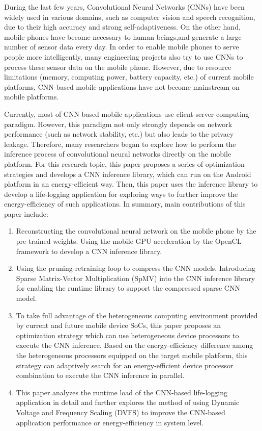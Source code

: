 \begin{enabstract}
During the last few years, Convolutional Neural Networks (CNNs) have been widely used in various domains, such as computer vision and speech recognition, due to their high accuracy and strong self-adaptiveness. On the other hand, mobile phones have become necessary to human beings,and generate a large number of sensor data every day. In order to enable mobile phones to serve people more intelligently, many engineering projects also try to use CNNs to process these sensor data on the mobile phone. However, due to resource limitations (memory, computing power, battery capacity, etc.) of current mobile platforms, CNN-based mobile applications have not become mainstream on mobile platforms.

Currently, most of CNN-based mobile applications use client-server computing paradigm. However, this paradigm not only strongly depends on network performance (such as network stability, etc.) but also leads to the privacy leakage. Therefore, many researchers began to explore how to perform the inference process of convolutional neural networks directly on the mobile platform. For this research topic, this paper proposes a series of optimization strategies and develops a CNN inference library, which can run on the Android platform in an energy-efficient way. Then, this paper uses the inference library to develop a life-logging application for exploring ways to further improve the energy-efficiency of such applications. In summary, main contributions of this paper include:

\begin{enumerate}
  \item Reconstructing the convolutional neural network on the mobile phone by the pre-trained weights. Using the mobile GPU acceleration by the OpenCL framework to develop a CNN inference library.
  \item Using the pruning-retraining loop to compress the CNN models. Introducing Sparse Matrix-Vector Multiplication (SpMV) into the CNN inference library for enabling the runtime library to support the compressed sparse CNN model.
  \item To take full advantage of the heterogeneous computing environment provided by current and future mobile device SoCs,  this paper proposes an optimization strategy which can use heterogeneous device processors to execute the CNN inference. Based on the energy-efficiency difference among the heterogeneous processors equipped on the target mobile platform, this strategy can adaptively search for an energy-efficient device processor combination to execute the CNN inference in parallel.
  \item This paper analyzes the runtime load of the CNN-based life-logging application in detail and further explores the method of using Dynamic Voltage and Frequency Scaling (DVFS) to improve the CNN-based application performance or energy-efficiency in system level.
\end{enumerate}

\end{enabstract}
